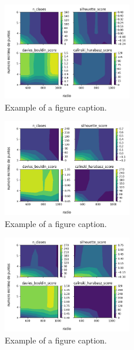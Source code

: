 \begin{figure}[htbp]
\centerline{\includegraphics[width=0.5\textwidth]{graficos_experimentos/dbscan/caracteristicos3_pca0.9.png}}
\caption{Example of a figure caption.}
\label{graficos_experimentos/dbscan/caracteristicos3_pca0.9.png}
\end{figure}
 
\begin{figure}[htbp]
\centerline{\includegraphics[width=0.5\textwidth]{graficos_experimentos/dbscan/caracteristicos3_pca0.95.png}}
\caption{Example of a figure caption.}
\label{graficos_experimentos/dbscan/caracteristicos3_pca0.95.png}
\end{figure}
 
\begin{figure}[htbp]
\centerline{\includegraphics[width=0.5\textwidth]{graficos_experimentos/dbscan/caracteristicos3_pca0.99.png}}
\caption{Example of a figure caption.}
\label{graficos_experimentos/dbscan/caracteristicos3_pca0.99.png}
\end{figure}
 
